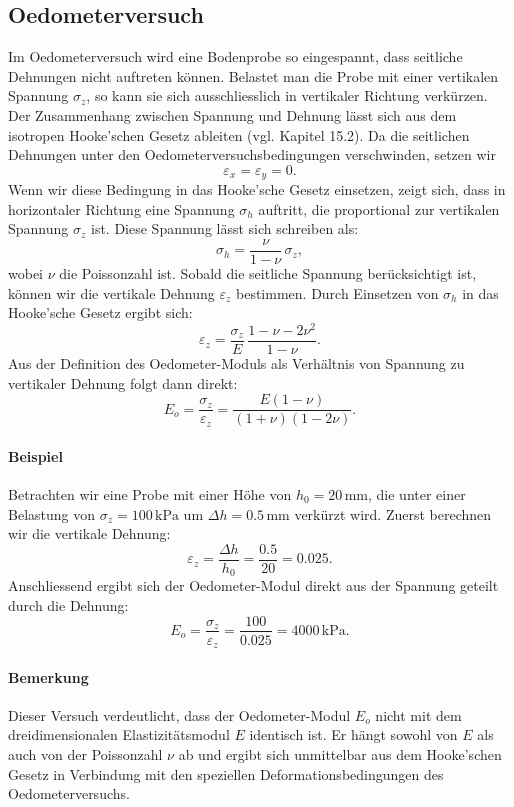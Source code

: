 \subsection{Oedometerversuch}
Im Oedometerversuch wird eine Bodenprobe so eingespannt, dass seitliche Dehnungen nicht auftreten können. 
Belastet man die Probe mit einer vertikalen Spannung \(\sigma_z\), so kann sie sich ausschliesslich in vertikaler Richtung verkürzen.  
Der Zusammenhang zwischen Spannung und Dehnung lässt sich aus dem isotropen Hooke’schen Gesetz ableiten (vgl. Kapitel 15.2). 
Da die seitlichen Dehnungen unter den Oedometerversuchsbedingungen verschwinden, setzen wir
\[
  \varepsilon_x = \varepsilon_y = 0.
\]
Wenn wir diese Bedingung in das Hooke’sche Gesetz einsetzen, zeigt sich, dass in horizontaler Richtung eine Spannung \(\sigma_h\) auftritt, die proportional zur vertikalen Spannung \(\sigma_z\) ist. 
Diese Spannung lässt sich schreiben als:
\[
  \sigma_h = \frac{\nu}{1-\nu}\,\sigma_z,
\]
wobei \(\nu\) die Poissonzahl ist.  
Sobald die seitliche Spannung berücksichtigt ist, können wir die vertikale Dehnung \(\varepsilon_z\) bestimmen. 
Durch Einsetzen von \(\sigma_h\) in das Hooke’sche Gesetz ergibt sich:
\[
  \varepsilon_z = \frac{\sigma_z}{E}\,\frac{1-\nu-2\nu^2}{1-\nu}.
\]
Aus der Definition des Oedometer-Moduls als Verhältnis von Spannung zu vertikaler Dehnung folgt dann direkt:
\[
  E_o = \frac{\sigma_z}{\varepsilon_z} = \frac{E(1-\nu)}{(1+\nu)(1-2\nu)}.
\]
\paragraph{Beispiel}   
Betrachten wir eine Probe mit einer Höhe von \(h_0 = 20\,\mathrm{mm}\), die unter einer Belastung von \(\sigma_z = 100\,\mathrm{kPa}\) um \(\Delta h = 0.5\,\mathrm{mm}\) verkürzt wird.  
Zuerst berechnen wir die vertikale Dehnung:
\[
  \varepsilon_z = \frac{\Delta h}{h_0} = \frac{0.5}{20} = 0.025.
\]
Anschliessend ergibt sich der Oedometer-Modul direkt aus der Spannung geteilt durch die Dehnung:
\[
  E_o = \frac{\sigma_z}{\varepsilon_z} = \frac{100}{0.025} = 4000\,\mathrm{kPa}.
\]
\paragraph{Bemerkung}  
Dieser Versuch verdeutlicht, dass der Oedometer-Modul \(E_o\) nicht mit dem dreidimensionalen Elastizitätsmodul \(E\) identisch ist. 
Er hängt sowohl von \(E\) als auch von der Poissonzahl \(\nu\) ab und ergibt sich unmittelbar aus dem Hooke’schen Gesetz in Verbindung mit den speziellen Deformationsbedingungen des Oedometerversuchs.
